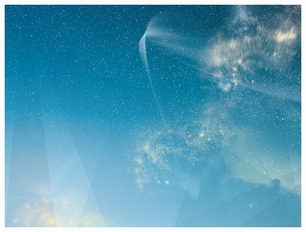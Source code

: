 \begin{frame}

\begin{minipage}[t][0cm]{\paperwidth}%
\hspace*{-\PraesentationSeitenrand}%
\includegraphics[width=\textwidth]{./Resources/Images/SternenhimmelQuer.jpg}
\end{minipage}
    
\end{frame}
\clearpage

